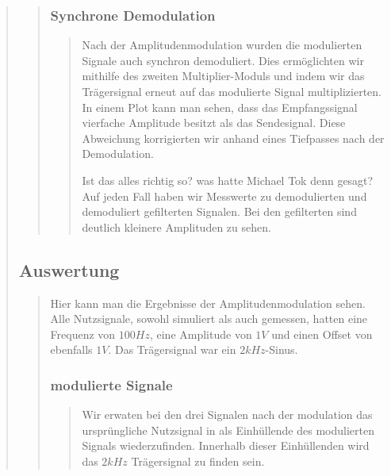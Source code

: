 \begin{quote}
\begin{quote}
    	\vspace{1em}
    	
    	\subsubsection{Synchrone Demodulation}
    	\begin{quote}
    	Nach der Amplitudenmodulation wurden die modulierten Signale auch
    	synchron demoduliert. Dies ermöglichten wir mithilfe des zweiten
    	Multiplier-Moduls und indem wir das Trägersignal erneut auf das modulierte
    	Signal multiplizierten. In einem Plot kann man sehen, dass das
    	Empfangssignal vierfache Amplitude besitzt als das Sendesignal.
    	Diese Abweichung korrigierten wir anhand eines Tiefpasses nach der
    	Demodulation.
    	
    	Ist das alles richtig so? was hatte Michael Tok denn gesagt? Auf jeden Fall
    	haben wir Messwerte zu demodulierten und demoduliert gefilterten Signalen.
    	Bei den gefilterten sind deutlich kleinere Amplituden zu sehen.
		\end{quote}    
    
    \end{quote}
    
    \subsection{Auswertung}
    \begin{quote}
        
        Hier kann man die Ergebnisse der Amplitudenmodulation sehen. Alle Nutzsignale, sowohl simuliert als auch
        gemessen, hatten eine Frequenz von $100 Hz$, eine Amplitude von $1 V$ und einen Offset von ebenfalls $1 V$. Das
        Trägersignal war ein $2 kHz$-Sinus.
        

        
        \subsubsection{modulierte Signale}
		\begin{quote}
		  
		  Wir erwaten bei den drei Signalen nach der modulation das ursprüngliche Nutzsignal in als Einhüllende des
		  modulierten Signals wiederzufinden. Innerhalb dieser Einhüllenden wird das $2kHz$ Trägersignal zu finden sein.
		  

\end{quote}
\end{quote}
\end{quote}

